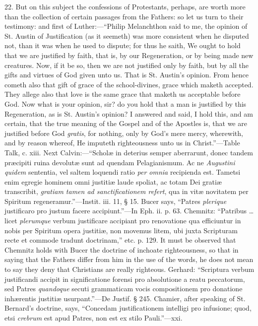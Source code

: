22. But on this subject the confessions of Protestants, perhaps,
are worth more than the collection of certain passages from the
Fathers: so let us turn to their testimony: and first of Luther:—``Philip
Melanchthon said to me, the opinion of St. Austin of Justification (as
it seemeth) was more consistent when he disputed not, than it was when
he used to dispute; for thus he saith, We ought to hold that we are
justified by faith, that is, by our Regeneration, or by being made new
creatures. Now, if it be so, then we are not justified only by faith,
but by all the gifts and virtues of God given unto us. That is St.
Austin's opinion. From hence cometh also that gift of grace of the
school-divines, grace which maketh accepted. They allege also that
love is the same grace that maketh us acceptable before God. Now what
is your opinion, sir? do you hold that a man is justified by
this Regeneration, as is St. Austin's opinion? I answered and said, I
hold this, and am certain, that the true meaning of the Gospel and of
the Apostles is, that we are justified before God \emph{gratis}, for
nothing, only by God's mere mercy, wherewith, and by reason whereof,
He imputeth righteousness unto us in Christ.''—Table Talk, c.
xiii. Next Calvin:—``Scholæ in deterius semper aberrarunt,
donec tandem præcipiti ruina devolutæ sunt ad quendam Pelagianismum.
Ac ne \emph{Augustini quidem} sententia, vel saltem loquendi ratio \emph{per
omnia} recipienda est. Tametsi enim egregie hominem omni justitiæ
laude spoliat, ac totam Dei gratiæ transcribit, \emph{gratiam tamen ad
sanctificationem refert}, qua in vitæ novitatem per Spiritum
regeneramur.''—Instit. iii. 11, § 15. Bucer says, ``Patres \emph{plerique} justificaro pro justum facere accipiunt.''—In Eph. ii.
p. 63. Chemnitz: ``Patribus … licet \emph{plerumque} verbum
justificare accipiant pro renovatione qua efficiuntur in nobis per
Spiritum opera justitiæ, non movemus litem, ubi juxta Scripturam
recte et commode tradunt doctrinam,'' etc. p. 129. It must be
observed that Chemnitz holds with Bucer the doctrine of inchoate
righteousness, so that in saying that the Fathers differ from him in
the use of the words, he does not mean to say they deny that
Christians are really righteous. Gerhard: ``Scriptura verbum
justificandi accipit in significatione forensi pro absolutione a reatu
peccatorum, sed Patres \emph{quandoque} secuti grammaticam vocis
compositionem pro donatione inhærentis justitiæ usurpant.''—De
Justif. § 245. Chamier, after speaking of St. Bernard's doctrine,
says, ``Concedam justificationem intelligi pro infusione; quod,
etsi \emph{crebrum} est apud Patres, non est ex stilo Pauli.''—xxi.
